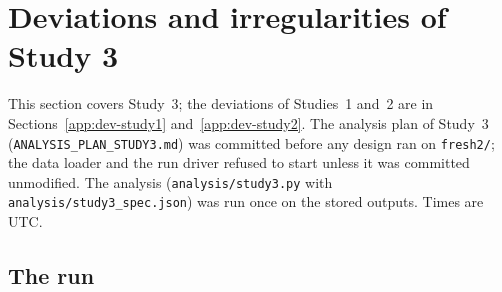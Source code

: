\section{Deviations and irregularities of Study 3}
\label{app:deviations}
\label{app:dev-study3}

This section covers Study~3; the deviations of Studies~1 and~2 are in Sections~\ref{app:dev-study1} and~\ref{app:dev-study2}. The analysis plan of Study~3 (\texttt{ANALYSIS\_\allowbreak{}PLAN\_\allowbreak{}STUDY3.md}) was committed before any design ran on \texttt{fresh2/}; the data loader and the run driver refused to start unless it was committed unmodified. The analysis (\texttt{analysis/\allowbreak{}study3.py} with \texttt{analysis/\allowbreak{}study3\_\allowbreak{}spec.json}) was run once on the stored outputs. Times are UTC.

\subsection{The run}

